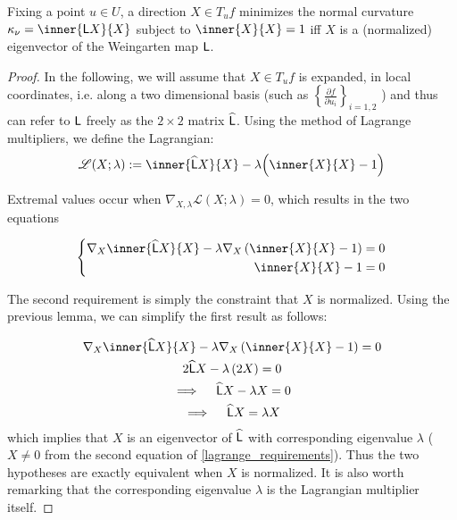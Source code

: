     \begin{theorem}
       	Fixing a point $u \in U$, a direction $X \in T_u f $ minimizes the normal curvature $\kappa_\nu = \inner{\wein X}{X}$ subject to $\inner{X}{X}= 1$
       	iff $X$ is a (normalized) eigenvector of the Weingarten map $\mathsf{L}$.
       	\end{theorem}
    \begin{proof}
       		In the following, we will assume that $X \in T_u f$ is expanded,
       		in local coordinates, i.e. along  a two dimensional basis
       		(such as $\left\{ \frac{\partial f}{\partial u_i}\right\}_{i=1,2}$
       		) and thus can refer to $\mathsf{L}$ freely as the $2\times2$ matrix $\widehat{\mathsf{L}}$.
       		Using the method of Lagrange multipliers, we define the Lagrangian:
       		\begin{equation}
       		\mathscr{L}(X; \lambda) :=
        	\inner{\weinmat X}{X} - \lambda\Big(\inner{X}{X} - 1\Big) 
     \end{equation}
        	
        	Extremal values occur when
        	$\nabla_{X,\lambda} \mathscr{L}(X;\lambda) = 0$,
        	which results in the two equations
        	
     \begin{equation} \label{lagrange_requirements}
     \left\{ \begin{aligned}
      \nabla_X \inner{\weinmat X}{X} - \lambda \nabla_X \left( \inner{X}{X} - 1 \right) = 0 \\
      \inner{X}{X} - 1 = 0
     \end{aligned} \right.
     \end{equation}
     
     The second requirement is simply the constraint that $X$ is normalized.
     Using the previous lemma, we can simplify the first result as follows:
     
     \begin{gather}
     \nabla_X \inner{\weinmat X}{X} - \lambda \nabla_X \left( \inner{X}{X} - 1 \right) = 0 
     \nonumber \\
     2\weinmat X - \lambda \left(2 X \right) = 0  \nonumber \\
     \implies \quad \weinmat X - \lambda X = 0 \nonumber \\
     \implies \quad \weinmat X = \lambda X
     \end{gather}
     which implies that $X$ is an eigenvector of  $\widehat{\mathsf{L}}$ with corresponding eigenvalue $\lambda$ ($X\ne 0 $ from the second equation of \cref{lagrange_requirements}).
     Thus the two hypotheses are exactly equivalent when $X$ is normalized. It is also worth remarking that the corresponding eigenvalue $\lambda$ is the Lagrangian multiplier itself.
       	\end{proof}
       	
